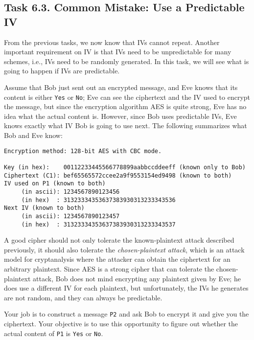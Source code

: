 \subsection{Task 6.3. Common Mistake: Use a Predictable IV} 

From the previous tasks, we now know that IVs cannot 
repeat. Another important requirement on IV is that 
IVs need to be unpredictable for many schemes, i.e., IVs need to
be randomly generated. In this task, we will see what is going to happen if
IVs are predictable. 

Assume that Bob just sent out an encrypted message, and Eve knows that its 
content is either \texttt{Yes} or \texttt{No}; Eve can see the ciphertext and the IV used 
to encrypt the message, but since the encryption algorithm AES is quite
strong, Eve has no idea what the actual content is. However, since Bob uses
predictable IVs, Eve knows exactly what IV Bob is going to use next.
The following summarizes what Bob and Eve know:

\begin{lstlisting}
Encryption method: 128-bit AES with CBC mode.

Key (in hex):    00112233445566778899aabbccddeeff (known only to Bob)
Ciphertext (C1): bef65565572ccee2a9f9553154ed9498 (known to both)
IV used on P1 (known to both) 
     (in ascii): 1234567890123456 
     (in hex)  : 31323334353637383930313233343536 
Next IV (known to both)
     (in ascii): 1234567890123457 
     (in hex)  : 31323334353637383930313233343537 
\end{lstlisting}


A good cipher should not only tolerate the known-plaintext attack described
previously, it should also tolerate the \textit{chosen-plaintext attack}, 
which is an attack model for cryptanalysis where the attacker can obtain the
ciphertext for an arbitrary plaintext. Since AES is a strong cipher that 
can tolerate the chosen-plaintext attack, Bob does not mind encrypting any 
plaintext given by Eve; he does use a different IV for each plaintext, 
but unfortunately, the IVs he generates are not random, and they can
always be predictable.


Your job is to construct a message \texttt{P2} and ask Bob to encrypt it and give you the
ciphertext. Your objective is to use this opportunity to 
figure out whether the actual content of \texttt{P1}  is \texttt{Yes} or \texttt{No}.  






